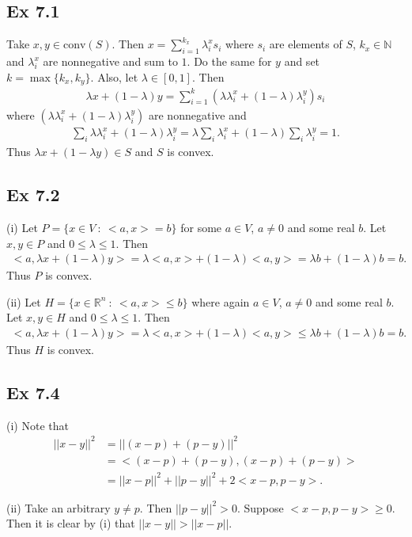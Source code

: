 \documentclass[letterpaper,12pt]{article}
\theoremstyle{definition}
\begin{document}
\begin{spacing}{1.3}{}
	\subsection*{Ex 7.1}
	Take $x,y\in\text{conv}(S)$.
	Then $x=\sum_{i=1}^{k_x}\lambda^x_is_i$ where $s_i$ are elements of $S$,
	$k_x\in\mathbb N$ and $\lambda^x_i$ are nonnegative and sum to $1$.
	Do the same for $y$ and set $k=\max\{k_x,k_y\}$.
	Also, let $\lambda\in[0,1]$.
	Then
	\begin{align*}
	\lambda x+(1-\lambda)y = \sum_{i=1}^k(\lambda\lambda^x_i+(1-\lambda)\lambda^y_i)s_i
	\end{align*}
	where $(\lambda\lambda^x_i+(1-\lambda)\lambda^y_i)$ are nonnegative and
	\begin{align*}
	\sum_i\lambda\lambda^x_i+(1-\lambda)\lambda^y_i=
	\lambda\sum_i\lambda^x_i+(1-\lambda)\sum_i\lambda^y_i=1.
	\end{align*}
	Thus $\lambda x+(1-\lambda y)\in S$ and $S$ is convex.
	
	\subsection*{Ex 7.2}
	(i)
	Let $P=\{x\in V\ :\ <a,x>=b\}$ for some $a\in V$, $a\neq 0$ and some real $b$.
	Let $x,y\in P$ and $0\leq\lambda\leq 1$.
	Then
	\begin{align*}
	<a,\lambda x+(1-\lambda)y>=\lambda<a,x>+(1-\lambda)<a,y>=\lambda b + (1-\lambda)b=b.
	\end{align*}
	Thus $P$ is convex.
	
	(ii)
	Let $H=\{x\in\mathbb R^n\ :\ <a,x>\leq b\}$ where again $a\in V$, $a\neq 0$ and some real $b$.
	Let $x,y\in H$ and $0\leq\lambda\leq 1$.
	Then 
	\begin{align*}
	<a,\lambda x+(1-\lambda)y>=\lambda<a,x>+(1-\lambda)<a,y>\leq\lambda b + (1-\lambda)b=b.
	\end{align*}
	Thus $H$ is convex.
	
	\subsection*{Ex 7.4}
	(i)
	Note that
	\begin{align*}
	||x-y||^2 &=||(x-p)+(p-y)||^2\\
	&=<(x-p)+(p-y),(x-p)+(p-y)>\\
	&=||x-p||^2+||p-y||^2+2<x-p,p-y>.
	\end{align*}
	
	(ii)
	Take an arbitrary $y\neq p$. Then $||p-y||^2> 0$.
	Suppose $<x-p,p-y>\geq0$. Then it is clear by (i)
	that $||x-y||>||x-p||$.
	

\end{spacing}
\end{document}
